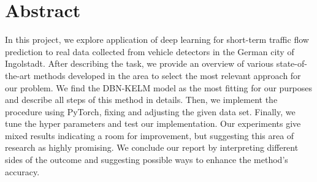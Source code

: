 \chapter*{Abstract}

In this project, we explore application of deep learning for short-term traffic
flow prediction to real data collected from vehicle detectors in the German city
of Ingolstadt. After describing the task, we provide an overview of various
state-of-the-art methods developed in the area to select the most relevant
approach for our problem. We find the DBN-KELM model \cite{Han.2020} as the most
fitting for our purposes and describe all steps of this method in details. Then,
we implement the procedure using PyTorch, fixing and adjusting the given data
set. Finally, we tune the hyper parameters and test our implementation. Our
experiments give mixed results indicating a room for improvement, but suggesting
this area of research as highly promising. We conclude our report by
interpreting different sides of the outcome and suggesting possible ways to
enhance the method's accuracy.
